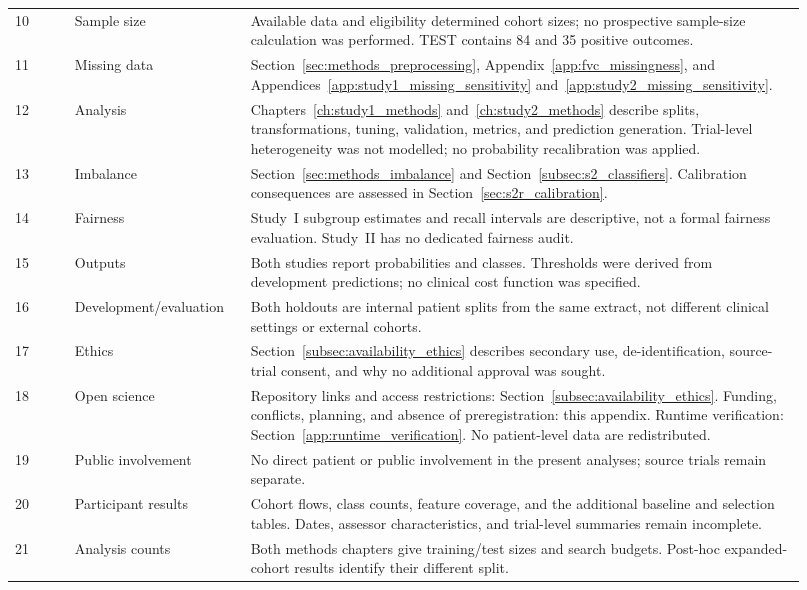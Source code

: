 \begin{longtable}{@{}p{0.07\linewidth}p{0.20\linewidth}p{0.65\linewidth}@{}}
10 & Sample size & Available data and eligibility determined cohort sizes; no prospective sample-size calculation was performed. TEST contains 84 and 35 positive outcomes. \\
11 & Missing data & Section~\ref{sec:methods_preprocessing}, Appendix~\ref{app:fvc_missingness}, and Appendices~\ref{app:study1_missing_sensitivity} and~\ref{app:study2_missing_sensitivity}. \\
12 & Analysis & Chapters~\ref{ch:study1_methods} and~\ref{ch:study2_methods} describe splits, transformations, tuning, validation, metrics, and prediction generation. Trial-level heterogeneity was not modelled; no probability recalibration was applied. \\
13 & Imbalance & Section~\ref{sec:methods_imbalance} and Section~\ref{subsec:s2_classifiers}. Calibration consequences are assessed in Section~\ref{sec:s2r_calibration}. \\
14 & Fairness & Study~I subgroup estimates and recall intervals are descriptive, not a formal fairness evaluation. Study~II has no dedicated fairness audit. \\
15 & Outputs & Both studies report probabilities and classes. Thresholds were derived from development predictions; no clinical cost function was specified. \\
16 & Development/evaluation & Both holdouts are internal patient splits from the same extract, not different clinical settings or external cohorts. \\
17 & Ethics & Section~\ref{subsec:availability_ethics} describes secondary use, de-identification, source-trial consent, and why no additional approval was sought. \\
18 & Open science & Repository links and access restrictions: Section~\ref{subsec:availability_ethics}. Funding, conflicts, planning, and absence of preregistration: this appendix. Runtime verification: Section~\ref{app:runtime_verification}. No patient-level data are redistributed. \\
19 & Public involvement & No direct patient or public involvement in the present analyses; source trials remain separate. \\
20 & Participant results & Cohort flows, class counts, feature coverage, and the additional baseline and selection tables. Dates, assessor characteristics, and trial-level summaries remain incomplete. \\
21 & Analysis counts & Both methods chapters give training/test sizes and search budgets. Post-hoc expanded-cohort results identify their different split. \\

\end{longtable}
